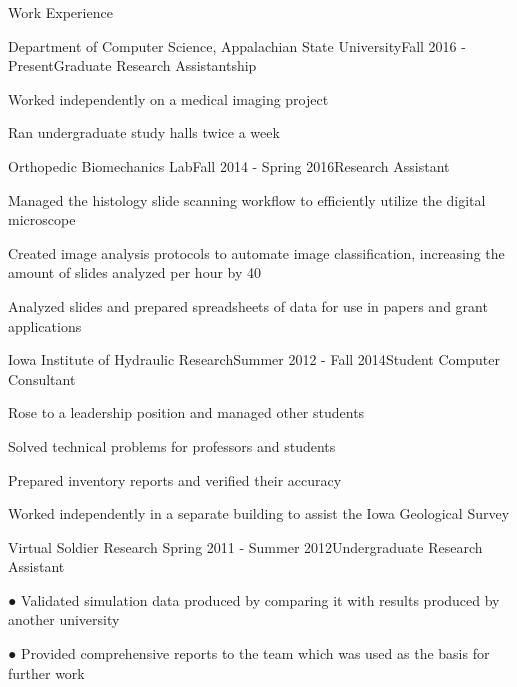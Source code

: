 \documentclass{resume} %
\begin{document}
\begin{rSection}{Work Experience}

\begin{rSubsection}{Department of Computer Science, Appalachian State University}{Fall 2016 - Present}{Graduate Research Assistantship}{}
\item Worked independently on a medical imaging project
\item Ran undergraduate study halls twice a week
\end{rSubsection}



\begin{rSubsection}{Orthopedic Biomechanics Lab}{Fall 2014 - Spring 2016}{Research Assistant}{}
\item Managed the histology slide scanning workflow to efficiently utilize the digital microscope
\item Created image analysis protocols to automate image classification, increasing the amount of slides analyzed per hour by 40%
\item Analyzed slides and prepared spreadsheets of data for use in papers and grant applications
\end{rSubsection}


\begin{rSubsection}{Iowa Institute of Hydraulic Research}{Summer 2012 - Fall 2014}{Student Computer Consultant}{}
	\item Rose to a leadership position and managed other students
	\item Solved technical problems for professors and students
	\item Prepared inventory reports and verified their accuracy
	\item Worked independently in a separate building to assist the Iowa Geological Survey
	
\end{rSubsection}


\begin{rSubsection}{Virtual Soldier Research }{Spring 2011 - Summer 2012}{Undergraduate Research Assistant}{}
	\item ●	Validated simulation data produced by comparing it with results produced by another university
	\item ●	Provided comprehensive reports to the team which was used as the basis for further work
\end{rSubsection}

\end{rSection}
\end{document}
